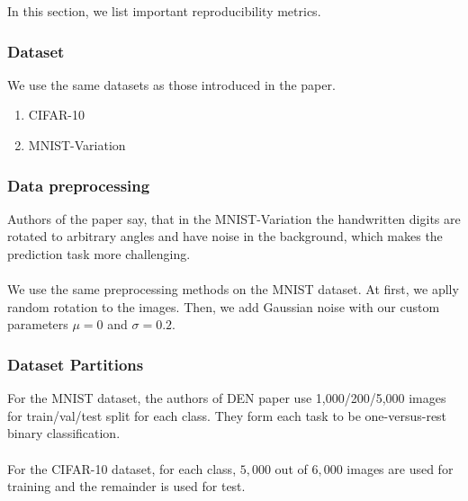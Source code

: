 \documentclass[12pt]{article}
\begin{document}
    In this section, we list important reproducibility metrics.  
    
    \subsubsection{Dataset}
    We use the same datasets as those introduced in the paper.
    \begin{enumerate}  
        \item CIFAR-10
        \item MNIST-Variation 
    \end{enumerate}
    
    \subsubsection{Data preprocessing}
    Authors of the paper say, that in the MNIST-Variation the handwritten digits are rotated to
    arbitrary angles and have noise in the background, which makes the prediction task more challenging.
    \\
    \\
    We use the same preprocessing methods on the MNIST dataset. At first, we aplly random rotation
    to the images. Then, we add Gaussian noise with our custom parameters $\mu = 0$ and $\sigma = 0.2$.
    
    \subsubsection{Dataset Partitions}
    For the MNIST dataset, the authors of DEN paper use 1,000/200/5,000 images for
    train/val/test split for each class.
    They form each task to be one-versus-rest binary classification.
    \\
    \\
    For the CIFAR-10 dataset, for each class, $5,000$ out of $6,000$ images are used for training and the remainder
    is used for test.
    
\end{document}
